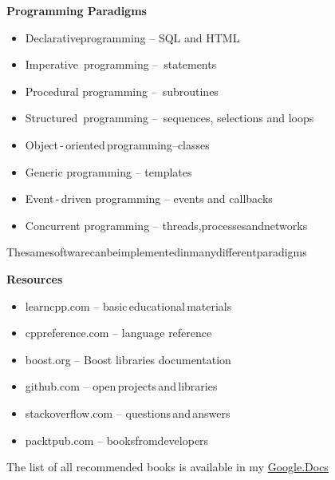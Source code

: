 \documentclass{beamer}
\begin{document}
\begin{frame}{\bf Programming Paradigms}
    
    \begin{itemize}

        \item Declarative\;programming -- SQL and HTML

        \item Imperative\, programming -- \,statements

        \item Procedural programming -- \,subroutines
        
        \item Structured\, programming -- \,sequences, selections and loops 
        
        \item Object\,-\,oriented\,programming\;--\;classes
        
        \item Generic programming -- templates

        \item Event\,-\,driven programming -- events and callbacks
        
        \item Concurrent programming -- threads,\;processes\;and\;networks
        
    \end{itemize}

    \begin{block}
    \justifying The\:same\:software\:can\:be\:implemented\:in\:many\:different\:paradigms
    \end{block}
    
\end{frame}

\begin{frame}{\bf Resources}

    \begin{itemize}

        \item learncpp.com -- basic\,educational\,materials

        \item cppreference.com -- language reference

        \item boost.org -- Boost libraries documentation

        \item github.com -- open\,projects\,and\,libraries

        \item stackoverflow.com -- questions\,and\,answers

        \item packtpub.com -- books\;from\;developers

    \end{itemize}

    \begin{block}
    \justifying The list of all recommended books is available in my \href{https://docs.google.com/spreadsheets/d/1MAx4-DoZUrZEB210XJ524e-0OogZRvH7QBorja_tGiw/edit?usp=sharing}{\color{G} Google.Docs}
    \end{block}
    
\end{frame}
\end{document}
